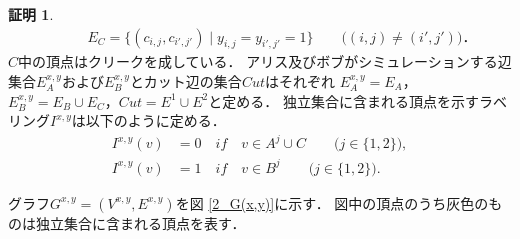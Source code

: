 \documentclass[12pt]{thesis}
\theoremstyle{definition}
\newtheorem*{prf*}{証明}
\begin{document}
\begin{prf*}
\begin{align*}
&\phantom{=} \quad E_{C} = \{(c_{i,j}, c_{i',j'}) \mid y_{i,j}=y_{i',j'}=1\} \quad \quad \text{($(i, j) \neq (i', j')$)}．
\end{align*}
$C$中の頂点はクリークを成している．
アリス及びボブがシミュレーションする辺集合$E^{x,y}_A$および$E^{x,y}_B$とカット辺の集合$Cut$はそれぞれ
$E^{x,y}_{A} = E_{A}$，$E^{x,y}_{B} = E_{B} \cup E_{C}$，$Cut = E^{1} \cup E^{2}$と定める．
独立集合に含まれる頂点を示すラベリング$I^{x,y}$は以下のように定める．
\begin{align*}
I^{x,y}(v) &= 0 \quad if \quad v \in A^{j} \cup C \quad \quad \text{($j \in \{1, 2\}$)}, \\
I^{x,y}(v) &= 1 \quad if \quad v \in B^{j} \quad \quad \text{($j \in \{1, 2\}$)}.
\end{align*}

グラフ$G^{x, y} = (V^{x,y}, E^{x,y})$を図 \ref{2_G(x,y)}に示す．
図中の頂点のうち灰色のものは独立集合に含まれる頂点を表す．


\end{prf*}
\end{document}
